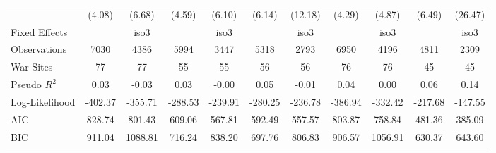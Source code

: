 \begin{tabular}{lcccccccccc}
& (4.08) & (6.68) & (4.59) & (6.10) & (6.14) & (12.18) & (4.29) & (4.87) & (6.49) & (26.47) \\
Fixed Effects &  & iso3 &  & iso3 &  & iso3 &  & iso3 &  & iso3 \\
Observations & 7030 & 4386 & 5994 & 3447 & 5318 & 2793 & 6950 & 4196 & 4811 & 2309 \\
War Sites & 77 & 77 & 55 & 55 & 56 & 56 & 76 & 76 & 45 & 45 \\
Pseudo $R^2$ & 0.03 & -0.03 & 0.03 & -0.00 & 0.05 & -0.01 & 0.04 & 0.00 & 0.06 & 0.14 \\
Log-Likelihood & -402.37 & -355.71 & -288.53 & -239.91 & -280.25 & -236.78 & -386.94 & -332.42 & -217.68 & -147.55 \\
AIC & 828.74 & 801.43 & 609.06 & 567.81 & 592.49 & 557.57 & 803.87 & 758.84 & 481.36 & 385.09 \\
BIC & 911.04 & 1088.81 & 716.24 & 838.20 & 697.76 & 806.83 & 906.57 & 1056.91 & 630.37 & 643.60 \\
\bottomrule
\end{tabular}
